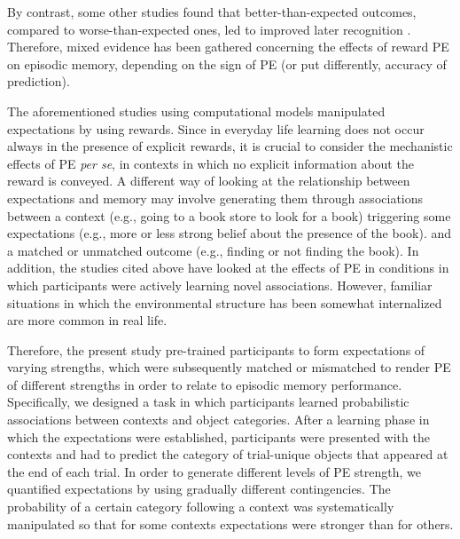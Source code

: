 \documentclass[a4paper,12pt]{article}
\begin{document}
By contrast, some other studies found that better-than-expected outcomes, compared to worse-than-expected ones, led to improved later recognition  \cite[][Experiment 2 ]{Jang2019, de2018signed, Rouhani2021}. Therefore, mixed evidence has been gathered concerning the effects of reward PE on episodic memory, depending on the sign of PE (or put differently, accuracy of prediction). \par%
The aforementioned studies using computational models manipulated expectations by using rewards. Since in everyday life learning does not occur always in the presence of explicit rewards, it is crucial to consider the mechanistic effects of PE \textit{per se}, in contexts in which no explicit information about the reward is conveyed. A different way of looking at the relationship between expectations and memory may involve generating them through associations between a context (e.g., going to a book store to look for a book) triggering some expectations (e.g., more or less strong belief about the presence of the book). and a matched or unmatched outcome (e.g., finding or not finding the book). 
In addition, the studies cited above have looked at the effects of PE in conditions in which participants were actively learning novel associations. However, familiar situations in which the environmental structure has been somewhat internalized are more common in real life.  
\par Therefore, the present study pre-trained participants to form expectations of varying strengths, which were subsequently matched or mismatched to render PE of different strengths in order to relate to episodic memory performance. Specifically, we designed a task in which participants learned probabilistic associations between contexts and object categories. After a learning phase in which the expectations were established, participants were presented with the contexts and had to predict the category of trial-unique objects that appeared at the end of each trial. In order to generate different levels of PE strength, we quantified expectations by using gradually different contingencies. The probability of a certain category following a context was systematically manipulated so that for some contexts expectations were stronger than for others.
\end{document}
